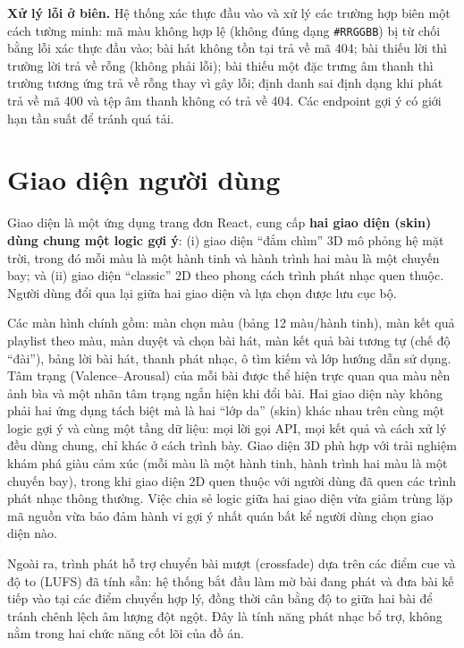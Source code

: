 \documentclass[../DoAn.tex]{subfiles}
\begin{document}
\textbf{Xử lý lỗi ở biên.} Hệ thống xác thực đầu vào và xử lý các trường hợp biên một cách tường minh: mã màu không hợp lệ (không đúng dạng \texttt{\#RRGGBB}) bị từ chối bằng lỗi xác thực đầu vào; bài hát không tồn tại trả về mã 404; bài thiếu lời thì trường lời trả về rỗng (không phải lỗi); bài thiếu một đặc trưng âm thanh thì trường tương ứng trả về rỗng thay vì gây lỗi; định danh sai định dạng khi phát trả về mã 400 và tệp âm thanh không có trả về 404. Các endpoint gợi ý có giới hạn tần suất để tránh quá tải.

\section{Giao diện người dùng}
\label{section:ui}
Giao diện là một ứng dụng trang đơn React, cung cấp \textbf{hai giao diện (skin) dùng chung một logic gợi ý}: (i) giao diện ``đắm chìm'' 3D mô phỏng hệ mặt trời, trong đó mỗi màu là một hành tinh và hành trình hai màu là một chuyến bay; và (ii) giao diện ``classic'' 2D theo phong cách trình phát nhạc quen thuộc. Người dùng đổi qua lại giữa hai giao diện và lựa chọn được lưu cục bộ.

Các màn hình chính gồm: màn chọn màu (bảng 12 màu/hành tinh), màn kết quả playlist theo màu, màn duyệt và chọn bài hát, màn kết quả bài tương tự (chế độ ``đài''), bảng lời bài hát, thanh phát nhạc, ô tìm kiếm và lớp hướng dẫn sử dụng. Tâm trạng (Valence--Arousal) của mỗi bài được thể hiện trực quan qua màu nền ảnh bìa và một nhãn tâm trạng ngắn hiện khi đổi bài. Hai giao diện này không phải hai ứng dụng tách biệt mà là hai ``lớp da'' (skin) khác nhau trên cùng một logic gợi ý và cùng một tầng dữ liệu: mọi lời gọi API, mọi kết quả và cách xử lý đều dùng chung, chỉ khác ở cách trình bày. Giao diện 3D phù hợp với trải nghiệm khám phá giàu cảm xúc (mỗi màu là một hành tinh, hành trình hai màu là một chuyến bay), trong khi giao diện 2D quen thuộc với người dùng đã quen các trình phát nhạc thông thường. Việc chia sẻ logic giữa hai giao diện vừa giảm trùng lặp mã nguồn vừa bảo đảm hành vi gợi ý nhất quán bất kể người dùng chọn giao diện nào.

Ngoài ra, trình phát hỗ trợ chuyển bài mượt (crossfade) dựa trên các điểm cue và độ to (LUFS) đã tính sẵn: hệ thống bắt đầu làm mờ bài đang phát và đưa bài kế tiếp vào tại các điểm chuyển hợp lý, đồng thời cân bằng độ to giữa hai bài để tránh chênh lệch âm lượng đột ngột. Đây là tính năng phát nhạc bổ trợ, không nằm trong hai chức năng cốt lõi của đồ án.
\end{document}
